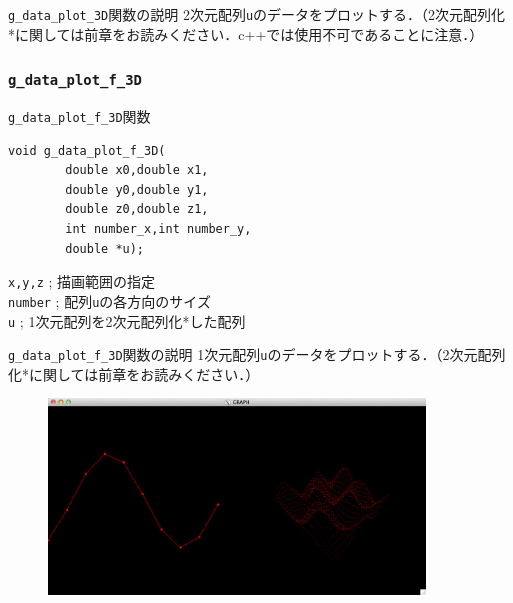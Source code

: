 \documentclass[a4paper,12pt]{jsarticle}%
\begin{document}
\begin{itembox}[l]{\texttt{g\_data\_plot\_3D}関数の説明}
2次元配列\verb|u|のデータをプロットする．（2次元配列化*に関しては前章をお読みください．c++では使用不可であることに注意．）
\end{itembox}

\begin{figure}[htb]
\end{figure}




\clearpage
\subsubsection{\texttt{g\_data\_plot\_f\_3D}}

\begin{itembox}[l]{\texttt{g\_data\_plot\_f\_3D}関数}
\begin{verbatim}
void g_data_plot_f_3D(
        double x0,double x1,
        double y0,double y1,
        double z0,double z1,
        int number_x,int number_y,
        double *u);
\end{verbatim}
\verb|x,y,z| ; 描画範囲の指定\\
\verb|number| ; 配列\verb|u|の各方向のサイズ\\
\verb|u| ; 1次元配列を2次元配列化*した配列
\end{itembox}

\begin{itembox}[l]{\texttt{g\_data\_plot\_f\_3D}関数の説明}
1次元配列\verb|u|のデータをプロットする．（2次元配列化*に関しては前章をお読みください．）
\end{itembox}

\begin{figure}[htb]
	\includegraphics[width=100mm]{./Figures/eps/Canvas_g_data_plot.eps}
\end{figure}
\end{document}
